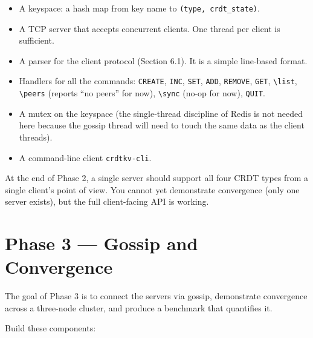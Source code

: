 \documentclass[11pt,a4paper]{article}
\begin{document}
\begin{itemize}
\item A keyspace: a hash map from key name to \texttt{(type, crdt\_state)}.

\item A TCP server that accepts concurrent clients. One thread per client is sufficient.

\item A parser for the client protocol (Section 6.1). It is a simple line-based format.

\item Handlers for all the commands: \texttt{CREATE}, \texttt{INC}, \texttt{SET}, \texttt{ADD}, \texttt{REMOVE}, \texttt{GET}, \verb|\list|, \verb|\peers| (reports ``no peers'' for now), \verb|\sync| (no-op for now), \texttt{QUIT}.

\item A mutex on the keyspace (the single-thread discipline of Redis is not needed here because the gossip thread will need to touch the same data as the client threads).

\item A command-line client \texttt{crdtkv-cli}.
\end{itemize}

At the end of Phase 2, a single server should support all four CRDT types from a single client's point of view. You cannot yet demonstrate convergence (only one server exists), but the full client-facing API is working.

\section{Phase 3 --- Gossip and Convergence}

The goal of Phase 3 is to connect the servers via gossip, demonstrate convergence across a three-node cluster, and produce a benchmark that quantifies it.

Build these components:
\end{document}
